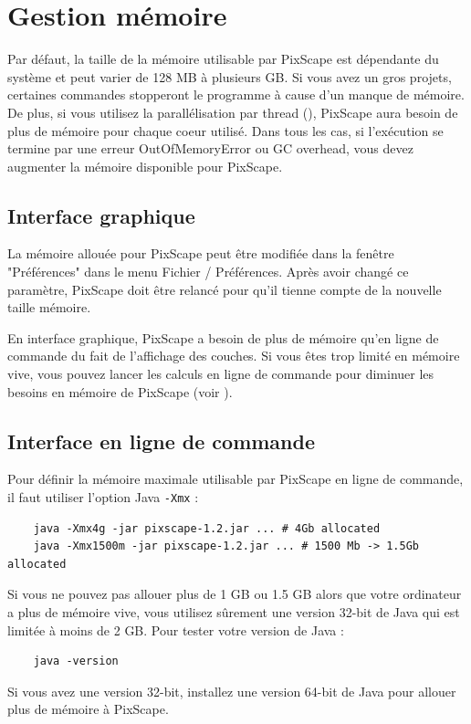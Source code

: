 \documentclass{report}
\begin{document}
\section{Gestion mémoire}
\label{memory}
Par défaut, la taille de la mémoire utilisable par PixScape est dépendante du système et peut varier de 128 MB à plusieurs GB.
Si vous avez un gros projets, certaines commandes stopperont le programme à cause d'un manque de mémoire. De plus, si vous utilisez la parallélisation par thread (), PixScape aura besoin de plus de mémoire pour chaque coeur utilisé.
Dans tous les cas, si l'exécution se termine par une erreur OutOfMemoryError ou GC overhead, vous devez augmenter la mémoire disponible pour PixScape.

\subsection{Interface graphique}
La mémoire allouée pour PixScape peut être modifiée dans la fenêtre "Préférences" dans le menu Fichier / Préférences. Après avoir changé ce paramètre, PixScape doit être relancé pour qu'il tienne compte de la nouvelle taille mémoire.

En interface graphique, PixScape a besoin de plus de mémoire qu'en ligne de commande du fait de l'affichage des couches. Si vous êtes trop limité en mémoire vive, vous pouvez lancer les calculs en ligne de commande pour diminuer les besoins en mémoire de PixScape (voir ).

\subsection{Interface en ligne de commande}
Pour définir la mémoire maximale utilisable par PixScape en ligne de commande, il faut utiliser l'option Java \verb|-Xmx| :
\begin{Verbatim}
	java -Xmx4g -jar pixscape-1.2.jar ... # 4Gb allocated
	java -Xmx1500m -jar pixscape-1.2.jar ... # 1500 Mb -> 1.5Gb allocated
\end{Verbatim}


Si vous ne pouvez pas allouer plus de 1 GB ou 1.5 GB alors que votre ordinateur a plus de mémoire vive, vous utilisez sûrement une version 32-bit de Java qui est limitée à moins de 2 GB.
Pour tester votre version de Java :
\begin{Verbatim}
	java -version
\end{Verbatim}
Si vous avez une version 32-bit, installez une version 64-bit de Java pour allouer plus de mémoire à PixScape.


\end{document}
